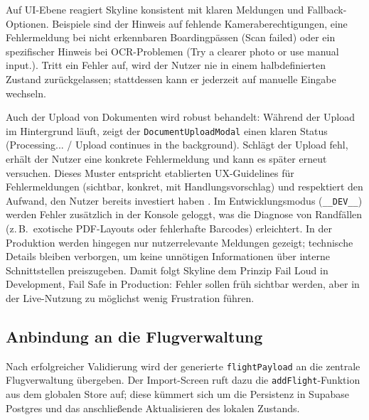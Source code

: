 Auf UI-Ebene reagiert Skyline konsistent mit klaren Meldungen und Fallback-Optionen.
Beispiele sind der Hinweis auf fehlende Kameraberechtigungen, eine Fehlermeldung bei nicht erkennbaren Boardingpässen (\glqq Scan failed\grqq) oder ein spezifischer Hinweis bei OCR-Problemen (\glqq Try a clearer photo or use manual input.\grqq).
Tritt ein Fehler auf, wird der Nutzer nie in einem halbdefinierten Zustand zurückgelassen; stattdessen kann er jederzeit auf manuelle Eingabe wechseln.

Auch der Upload von Dokumenten wird robust behandelt:
Während der Upload im Hintergrund läuft, zeigt der \texttt{DocumentUploadModal} einen klaren Status (\glqq Processing...\grqq{} / \glqq Upload continues in the background\grqq).
Schlägt der Upload fehl, erhält der Nutzer eine konkrete Fehlermeldung und kann es später erneut versuchen.
Dieses Muster entspricht etablierten UX-Guidelines für Fehlermeldungen (sichtbar, konkret, mit Handlungsvorschlag) und respektiert den Aufwand, den Nutzer bereits investiert haben \cite{androidNotifications,expoDocs}.
Im Entwicklungsmodus (\texttt{\_\_DEV\_\_}) werden Fehler zusätzlich in der Konsole geloggt, was die Diagnose von Randfällen (z.\,B.\ exotische PDF-Layouts oder fehlerhafte Barcodes) erleichtert.
In der Produktion werden hingegen nur nutzerrelevante Meldungen gezeigt; technische Details bleiben verborgen, um keine unnötigen Informationen über interne Schnittstellen preiszugeben.
Damit folgt Skyline dem Prinzip \glqq Fail Loud in Development, Fail Safe in Production\grqq{}: Fehler sollen früh sichtbar werden, aber in der Live-Nutzung zu möglichst wenig Frustration führen.

\subsection{Anbindung an die Flugverwaltung}

Nach erfolgreicher Validierung wird der generierte \texttt{flightPayload} an die zentrale Flugverwaltung übergeben.
Der Import-Screen ruft dazu die \texttt{addFlight}-Funktion aus dem globalen Store auf; diese kümmert sich um die Persistenz in Supabase Postgres und das anschließende Aktualisieren des lokalen Zustands.

